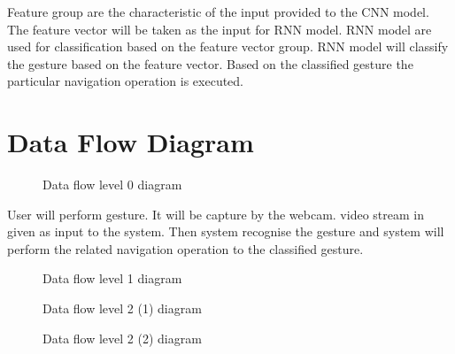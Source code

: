 \documentclass[oneside,a4paper,12pt]{report}
\begin{document}
        Feature group are the characteristic of the input provided to the CNN model.
        The feature vector will be taken as the input for RNN model. RNN model are used for classification based on the feature vector group. RNN model will classify the gesture based on the feature vector.
        Based on the classified gesture the particular navigation operation is executed.
    
     \pagebreak
    \section{Data Flow Diagram}
    
        \begin{center}
        	\begin{figure}[!hp]
        		\centering
        	  \caption{Data flow level 0 diagram}
        	  \label{fig:Data flow level 0}
        	\end{figure}
        \end{center} 
        User will perform gesture. It will be capture by the webcam. video stream in given as input to the system. Then system recognise the gesture and system will perform the related navigation operation to the classified gesture.
        
        \begin{center}
        	\begin{figure}[!hp]
        		\centering
        	  \caption{Data flow level 1 diagram}
        	  \label{fig:Data flow level 1}
        	\end{figure}
        \end{center}
        
        \begin{center}
        	\begin{figure}[!hp]
        		\centering
        	  \caption{Data flow level 2 (1) diagram}
        	  \label{fig:Data flow level 2}
        	\end{figure}
        \end{center}
        
        \begin{center}
        	\begin{figure}[!hp]
        		\centering
        	  \caption{Data flow level 2 (2) diagram}
        	  \label{fig:Data flow level 2}
        	\end{figure}
        \end{center}
        
\end{document}
